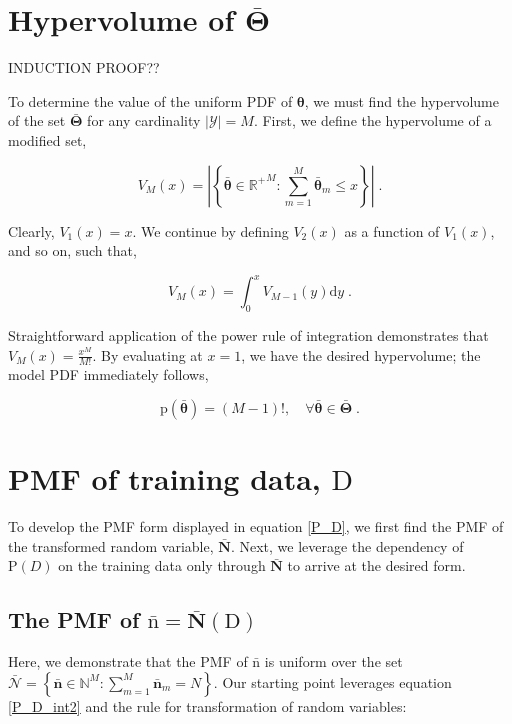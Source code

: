 \documentclass[12pt]{article}
\begin{document}
\appendix


\section{Hypervolume of $\bar{\bm{\Theta}}$}

INDUCTION PROOF??

To determine the value of the uniform PDF of $\bm{\theta}$, we must find the hypervolume of the set $\bar{\bm{\Theta}}$ for any cardinality $|\mathcal{Y}| = M$. First, we define the hypervolume of a modified set,

\begin{equation}
V_M(x) = \left| \left\{ \bar{\bm{\theta}} \in {\mathbb{R}^+}^{M}: \sum_{m=1}^{M} \bar{\bm{\theta}}_m \leq x \right\} \right| \;.
\end{equation}

Clearly, $V_1(x) = x$. We continue by defining $V_2(x)$ as a function of $V_1(x)$, and so on, such that,

\begin{equation}
V_M(x) = \int_0^x V_{M-1}(y) \mathrm{d}y \;.
\end{equation}

Straightforward application of the power rule of integration demonstrates that $V_M(x) = \frac{x^M}{M!}$. By evaluating at $x=1$, we have the desired hypervolume; the model PDF immediately follows,

\begin{equation}
\text{p}\left(\bar{\bm{\theta}}\right)= (M-1)!,  \quad \forall \bar{\bm{\theta}} \in \bar{\bm{\Theta}} \;.
\end{equation}




\section{PMF of training data, $\mathrm{D}$}

To develop the PMF form displayed in equation \eqref{P_D}, we first find the PMF of the transformed random variable, $\bar{\bm{N}}$. Next, we leverage the dependency of $\text{P}(D)$ on the training data only through $\bar{\bm{N}}$ to arrive at the desired form.

\subsection{The PMF of $\bar{\bm{\mathrm{n}}} = \bar{\bm{N}}(\mathrm{D})$}
Here, we demonstrate that the PMF of $\bar{\bm{\mathrm{n}}}$ is uniform over the set $\bar{\mathcal{N}} = \left\{ \bar{\bm{n}} \in \mathbb{N}^M: \sum_{m=1}^M \bar{\bm{n}}_m = N \right\}$. Our starting point leverages equation \eqref{P_D_int2} and the rule for transformation of random variables:
\end{document}
